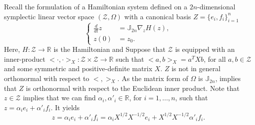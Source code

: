 Recall the formulation of a Hamiltonian system defined on a $2n$-dimensional symplectic linear vector space $(\mathcal Z,\Omega )$ with a canonical basis $Z = \{ e_i , f_i \}_{i=1}^{n}$
\begin{equation} \label{p1.eq:nommor.0}
	\left\{
	\begin{aligned}
		\frac d {dt} z &= \mathbb J_{2n} \nabla_z H(z), \\
		z(0) &= z_0.
	\end{aligned}
	\right.
\end{equation}
Here, $H: \mathcal Z \to \mathbb R$ is the Hamiltonian and  Suppose that $\mathcal Z$ is equipped with an inner-product $<\cdot,\cdot>_X : \mathcal Z \times \mathcal Z \to \mathbb R$ such that $<a,b>_X = a^TXb$, for all $a,b\in\mathcal Z$ and some symmetric and positive-definite matrix $X$. $Z$ is not in general orthonormal with respect to $<,>_X$. As the matrix form of $\Omega$ is $\mathbb J_{2n}$,  implies that $Z$ is orthonormal with respect to the Euclidean inner product. Note that $z\in \mathcal Z$ implies that we can find $\alpha_i,\alpha'_i \in \mathbb R$, for $i=1,\dots,n$, such that $z = \alpha_i e_i + \alpha'_i f_i$. It yields
\begin{equation}
	z = \alpha_i e_i + \alpha'_i f_i = \alpha_i X^{1/2} X^{-1/2}e_i + X^{1/2} X^{-1/2} \alpha'_i f_i.
\end{equation}
